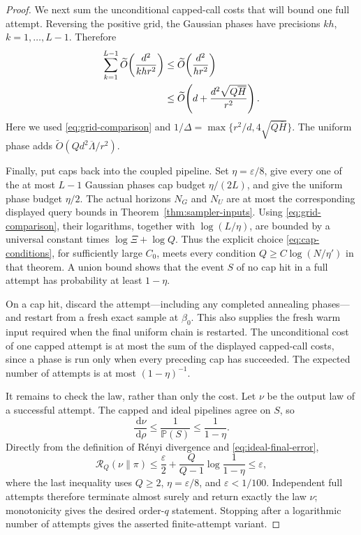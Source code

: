 \documentclass[11pt]{article}
\theoremstyle{remark}
\newcommand{\Pp}{\mathbb P}
\newcommand{\1}{\bm 1}
\newcommand{\eps}{\varepsilon}
\newcommand{\dd}{\,\mathrm d}
\begin{document}
\begin{proof}
We next sum the unconditional capped-call costs that will bound one
full attempt.  Reversing the positive grid, the Gaussian phases have
precisions $kh$, $k=1,\ldots,L-1$.  Therefore
\begin{align}
 \sum_{k=1}^{L-1}\widetilde O\!\left(
      \frac{d^2}{khr^2}\right)
 &\leq
 \widetilde O\!\left(\frac{d^2}{hr^2}\right)\notag\\
 &\leq\widetilde O\!\left(
   d+\frac{d^2\sqrt{Q\overline H}}{r^2}
 \right).
 \label{eq:harmonic-cost}
\end{align}
Here we used \eqref{eq:grid-comparison} and
$1/\Delta=\max\{r^2/d,4\sqrt{Q\overline H}\}$.  The uniform phase adds
$\widetilde O(Qd^2\overline\Lambda/r^2)$.

Finally, put caps back into the coupled pipeline.  Set
$\eta=\eps/8$, give every one of the at most $L-1$ Gaussian phases cap
budget $\eta/(2L)$, and give the uniform phase budget $\eta/2$.  The
actual horizons $N_G$ and $N_U$ are at most the corresponding displayed
query bounds in Theorem~\ref{thm:sampler-inputs}.  Using
\eqref{eq:grid-comparison}, their logarithms, together with
$\log(L/\eta)$, are bounded by a universal constant times
$\log\Xi+\log Q$.  Thus the explicit choice
\eqref{eq:cap-conditions}, for sufficiently large $C_0$, meets every
condition $Q\geq C\log(N/\eta')$ in that theorem.  A union bound shows
that the event $S$ of no cap hit in a full attempt has probability at
least $1-\eta$.

On a cap hit, discard the attempt---including any completed annealing
phases---and restart from a fresh exact sample at $\beta_0$.  This also
  supplies the fresh warm input required when the final uniform chain is
  restarted.  The unconditional cost of one capped attempt is at most
  the sum of the displayed capped-call costs, since a phase is run only
  when every preceding cap has succeeded.  The expected number of
  attempts is at most $(1-\eta)^{-1}$.

It remains to check the law, rather than only the cost.  Let $\nu$ be
the output law of a successful attempt.  The capped and ideal pipelines
agree on $S$, so
\[
  \frac{\dd\nu}{\dd\rho}\leq\frac1{\Pp(S)}
  \leq\frac1{1-\eta}.
\]
Directly from the definition of R\'enyi divergence and
\eqref{eq:ideal-final-error},
\[
  \mathcal R_Q(\nu\|\pi)
  \leq\frac{\eps}{2}+\frac{Q}{Q-1}\log\frac1{1-\eta}
  \leq\eps,
\]
where the last inequality uses $Q\geq2$, $\eta=\eps/8$, and
$\eps<1/100$.  Independent full attempts therefore terminate almost
surely and return exactly the law $\nu$; monotonicity gives the desired
order-$q$ statement.  Stopping after a logarithmic number of attempts
gives the asserted finite-attempt variant.
\end{proof}
\end{document}
